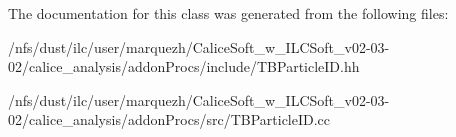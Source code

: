 The documentation for this class was generated from the following files\-:\begin{DoxyCompactItemize}
\item 
/nfs/dust/ilc/user/marquezh/\-Calice\-Soft\-\_\-w\-\_\-\-I\-L\-C\-Soft\-\_\-v02-\/03-\/02/calice\-\_\-analysis/addon\-Procs/include/T\-B\-Particle\-I\-D.\-hh\item 
/nfs/dust/ilc/user/marquezh/\-Calice\-Soft\-\_\-w\-\_\-\-I\-L\-C\-Soft\-\_\-v02-\/03-\/02/calice\-\_\-analysis/addon\-Procs/src/T\-B\-Particle\-I\-D.\-cc\end{DoxyCompactItemize}
